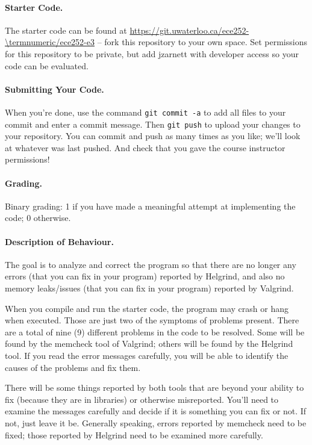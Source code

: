 \paragraph{Starter Code.} The starter code can be found at \url{https://git.uwaterloo.ca/ece252-\termnumeric/ece252-e3} -- fork this repository to your own space. Set permissions for this repository to be private, but add jzarnett with developer access so your code can be evaluated.

\paragraph{Submitting Your Code.} When you're done, use the command \texttt{git commit -a} to add all files to your commit and enter a commit message. Then \texttt{git push} to upload your changes to your repository. You can commit and push as many times as you like; we'll look at whatever was last pushed. And check that you gave the course instructor permissions!

\paragraph{Grading.} Binary grading: 1 if you have made a meaningful attempt at implementing the code; 0 otherwise.

\paragraph{Description of Behaviour.} The goal is to analyze and correct the program so that there are no longer any errors (that you can fix in your program) reported by Helgrind, and also no memory leaks/issues (that you can fix in your program) reported by Valgrind.

When you compile and run the starter code, the program may crash or hang when executed. Those are just two of the symptoms of problems present. There are a total of nine (9) different problems in the code to be resolved. Some will be found by the memcheck tool of Valgrind; others will be found by the Helgrind tool. If you read the error messages carefully, you will be able to identify the causes of the problems and fix them.

There will be some things reported by both tools that are beyond your ability to fix (because they are in libraries) or otherwise misreported. You'll need to examine the messages carefully and decide if it is something you can fix or not. If not, just leave it be. Generally speaking, errors reported by memcheck need to be fixed; those reported by Helgrind need to be examined more carefully.

